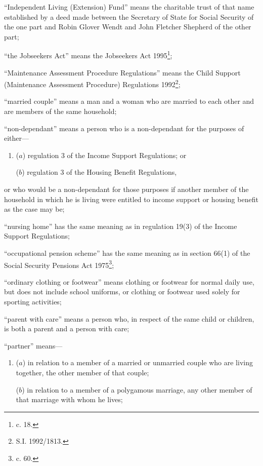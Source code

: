 \documentclass[12pt,a4paper]{article}
\begin{document}
\begin{enumerate}
“Independent Living (Extension) Fund” means the charitable trust of that name established by a deed made between the Secretary of State for Social Security of the one part and Robin Glover Wendt and John Fletcher Shepherd of the other part;

“the Jobseekers Act” means the Jobseekers Act 1995\footnote{ c. 18.};

“Maintenance Assessment Procedure Regulations” means the Child Support (Maintenance Assessment Procedure) Regulations 1992\footnote{\frenchspacing S.I. 1992/1813.};

“married couple” means a man and a woman who are married to each other and are members of the same household;

“non-dependant” means a person who is a non-dependant for the purposes of either—
\begin{enumerate}\item[]
($a$)
regulation 3 of the Income Support Regulations; or

($b$)
regulation 3 of the Housing Benefit Regulations,
\end{enumerate}
or who would be a non-dependant for those purposes if another member of the household in which he is living were entitled to income support or housing benefit as the case may be;

“nursing home” has the same meaning as in regulation 19(3) of the Income Support Regulations;

“occupational pension scheme” has the same meaning as in section 66(1) of the Social Security Pensions Act 1975\footnote{ c. 60.};

“ordinary clothing or footwear” means clothing or footwear for normal daily use, but does not include school uniforms, or clothing or footwear used solely for sporting activities;

“parent with care” means a person who, in respect of the same child or children, is both a parent and a person with care;

“partner” means—
\begin{enumerate}\item[]
($a$)
in relation to a member of a married or unmarried couple who are living together, the other member of that couple;

($b$)
in relation to a member of a polygamous marriage, any other member of that marriage with whom he lives;
\end{enumerate}


\end{enumerate}
\end{document}

